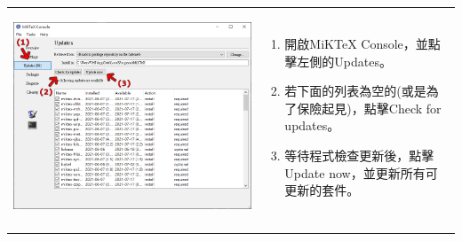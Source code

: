 \documentclass{../indiv}
\begin{document}
\begin{table}[H]
\begin{tabular}{Z}
\begin{tabmp}[-0.3]
				\includegraphics[width=\linewidth]{miktex-install-6.png}
			\end{tabmp} &
			\begin{tabmp}
				\begin{enumerate}[label=\texttt{(\arabic*)}, nosep, left=0pt, labelsep=0.5ex]
					\item 開啟MiKTeX Console，並點擊左側的Updates。
					\item 若下面的列表為空的(或是為了保險起見)，點擊Check for updates。
					\item 等待程式檢查更新後，點擊Update now，並更新所有可更新的套件。
				\end{enumerate}
			\end{tabmp}\\\Thline
		\end{tabular}
		\label{tab:MiKTeX Installation}
	\end{table}
\end{document}
